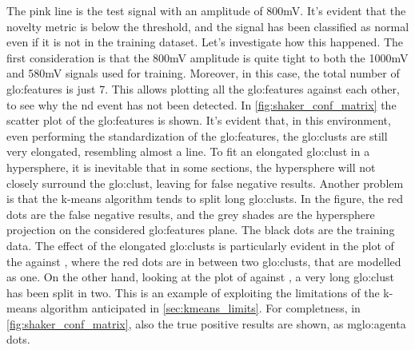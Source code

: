 The pink line is the test signal with an amplitude of 800mV. It's evident that the novelty metric is below the threshold, and the signal has been classified as normal even if it is not in the training dataset. Let's investigate how this happened. The first consideration is that the 800mV amplitude is quite tight to both the 1000mV and 580mV signals used for training. Moreover, in this case, the total number of \gls{glo:feature}s is just 7. This allows plotting all the \gls{glo:feature}s against each other, to see why the \gls{nd} event has not been detected. In \autoref{fig:shaker_conf_matrix} the scatter plot of the \gls{glo:feature}s is shown. It's evident that, in this environment, even performing the standardization of the \gls{glo:feature}s, the \gls{glo:clust}s are still very elongated, resembling almost a line. To fit an elongated \gls{glo:clust} in a hypersphere, it is inevitable that in some sections, the hypersphere will not closely surround the \gls{glo:clust}, leaving  for false negative results. Another problem is that the k-means algorithm tends to split long \gls{glo:clust}s. In the figure, the red dots are the false negative results, and the grey shades are the hypersphere projection on the considered \gls{glo:feature}s plane. The black dots are the training data. The effect of the elongated \gls{glo:clust}s is particularly evident in the plot of the  against , where the red dots are in between two \gls{glo:clust}s, that are modelled as one. On the other hand, looking at the plot of  against , a very long \gls{glo:clust} has been split in two. This is an example of exploiting the limitations of the k-means algorithm anticipated in \autoref{sec:kmeans_limits}. 
For completness, in \autoref{fig:shaker_conf_matrix}, also the true positive results are shown, as m\gls{glo:agent}a dots.


